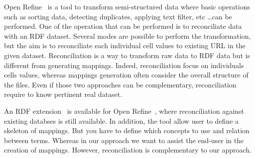 % 
Open Refine~\cite{verborgh2013using} is a tool to transform semi-structured data where basic operations such as sorting data, detecting duplicates, applying text
filter, etc \dots can be performed. One of the operation that can be performed is to reconciliate data with an RDF dataset.
Several modes are possible to perform the transformation, but the aim is to reconciliate each individual cell values to existing URL
in the given dataset. Reconciliation is a way to transform raw data to RDF data but is different from generating mappings.
Indeed, reconciliation focus on individuals cells values, whereas mappings generation often consider the overall structure of the files.
Even if those two approaches can be complementary, reconciliation require to know pertinent real dataset.


An RDF extension~\cite{maali2011re} is available for Open Refine~\cite{verborgh2013using}, where reconciliation against existing
databses is still available. In addition, the tool allow user to define a skeleton of mappings. But you have to define which
concepts to use and relation between terms. Whereas in our approach we want to assist the end-user in the creation of mappings.
However, reconciliation is complementary to our approach.


